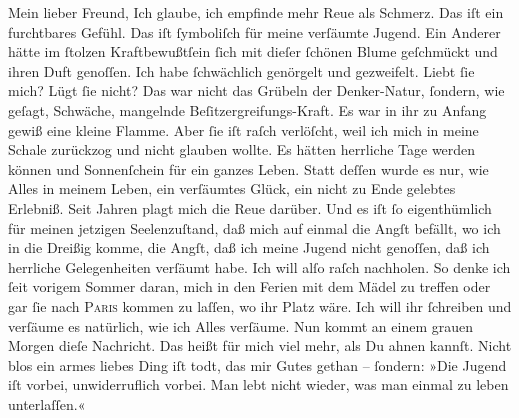 \pstart\center{}Mein lieber Freund,\pend\vspace{0.5em}
\pstart
           Ich glaube, ich empfinde mehr Reue als Schmerz. Das iſt ein furchtbares Gefühl. Das
                  \label{K_L02628-1v}\label{K_L02628-1} iſt ſymboliſch für meine verſäumte Jugend. Ein
               Anderer hätte im ſtolzen Kraftbewußtſein ſich mit dieſer ſchönen Blume geſchmückt und ihren Duft genoſſen. Ich
               habe ſchwächlich genörgelt und gezweifelt. Liebt ſie mich? Lügt ſie nicht? Das war
               nicht das Grübeln der Denker-Natur, ſondern, wie geſagt, Schwäche, mangelnde
               Beſitzergreifungs-Kraft. Es war in ihr zu Anfang gewiß eine kleine Flamme. Aber ſie
               iſt {\pb}raſch verlöſcht, weil ich mich in meine Schale
               zurückzog und nicht glauben wollte. Es hätten herrliche Tage werden können und
               Sonnenſchein für ein ganzes Leben. Statt deſſen wurde es nur, wie Alles in meinem
               Leben, ein verſäumtes Glück, ein nicht zu Ende gelebtes Erlebniß. Seit Jahren plagt
               mich die Reue darüber. Und es iſt ſo eigenthümlich für meinen jetzigen Seelenzuſtand,
               daß mich auf einmal die Angſt befällt, wo ich in die Dreißig komme, die Angſt, daß
               ich \strikeout{\textcolor{gray}{d}} meine Jugend nicht genoſſen, daß ich herrliche Gelegenheiten verſäumt habe.
               Ich will alſo raſch nachholen. So denke ich ſeit vorigem Sommer daran, mich in den
               Ferien {\pb}mit dem Mädel zu treffen oder gar ſie nach \textsc{Paris} kommen zu laſſen, wo ihr Platz wäre. Ich will ihr ſchreiben und verſäume es
               natürlich, wie ich Alles verſäume. Nun kommt an einem grauen Morgen dieſe Nachricht.
               Das heißt für mich viel mehr, als Du ahnen kannſt. Nicht blos ein armes liebes Ding iſt todt, das mir Gutes
               gethan – ſondern: »Die Jugend iſt vorbei, unwiderruflich vorbei. Man lebt nicht
               wieder, was man einmal zu leben unterlaſſen.«\pend
           
